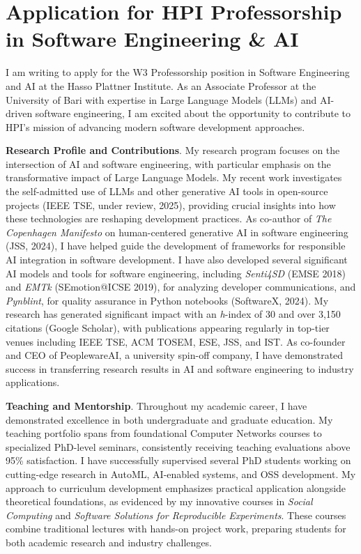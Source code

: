 \section{Application for HPI Professorship in Software Engineering \& AI}

I am writing to apply for the W3 Professorship position in Software Engineering and AI at the Hasso Plattner Institute.
As an Associate Professor at the University of Bari with expertise in Large Language Models (LLMs) and AI-driven software engineering, I am excited about the opportunity to contribute to HPI's mission of advancing modern software development approaches.

\textbf{Research Profile and Contributions}.
My research program focuses on the intersection of AI and software engineering, with particular emphasis on the transformative impact of Large Language Models.
My recent work investigates the self-admitted use of LLMs and other generative AI tools in open-source projects (IEEE TSE, under review, 2025), providing crucial insights into how these technologies are reshaping development practices. 
As co-author of \textit{The Copenhagen Manifesto} on human-centered generative AI in software engineering (JSS, 2024), I have helped guide the development of frameworks for responsible AI integration in software development. 
I have also developed several significant AI models and tools for software engineering, including \textit{Senti4SD} (EMSE 2018) and \textit{EMTk} (SEmotion@ICSE 2019), for analyzing developer communications, and \textit{Pynblint}, for quality assurance in Python notebooks (SoftwareX, 2024).
My research has generated significant impact with an \textit{h}-index of 30 and over 3,150 citations (Google Scholar), with publications appearing regularly in top-tier venues including IEEE TSE, ACM TOSEM, ESE, JSS, and IST.
As co-founder and CEO of PeoplewareAI, a university spin-off company, I have demonstrated success in transferring research results in AI and software engineering to industry applications. 

\textbf{Teaching and Mentorship}.
Throughout my academic career, I have demonstrated excellence in both undergraduate and graduate education. 
My teaching portfolio spans from foundational Computer Networks courses to specialized PhD-level seminars, consistently receiving teaching evaluations above 95\% satisfaction. 
I have successfully supervised several PhD students working on cutting-edge research in AutoML, AI-enabled systems, and OSS development. 
My approach to curriculum development emphasizes practical application alongside theoretical foundations, as evidenced by my innovative courses in \textit{Social Computing} and \textit{Software Solutions for Reproducible Experiments}.
These courses combine traditional lectures with hands-on project work, preparing students for both academic research and industry challenges.

